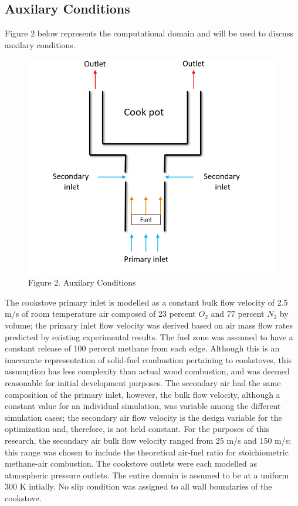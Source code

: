 \documentclass[3p,times,twocolumn]{elsarticle}
\begin{document}
\subsection{Auxilary Conditions}
Figure 2 below represents the computational domain and will be used to discuss auxilary conditions.

\begin{figure}{\linewidth}
	\includegraphics[width=\linewidth]{auxconditions}
	\centering
	\caption{Figure 2. Auxilary Conditions}
\end{figure}

The cookstove primary inlet is modelled as a constant bulk flow velocity of 2.5 m/s of room temperature air composed of 23 percent $O_{2}$ and 77 percent $N_{2}$ by volume; the primary inlet flow velocity was derived based on air mass flow rates predicted by existing experimental results. The fuel zone was assumed to have a constant release of 100 percent methane from each edge. Although this is an inaccurate representation of solid-fuel combustion pertaining to cookstoves, this assumption has less complexity than actual wood combustion, and was deemed reasonable for initial development purposes. The secondary air had the same composition of the primary inlet, however, the bulk flow velocity, although a constant value for an individual simulation, was variable among the different simulation cases; the secondary air flow velocity is the design variable for the optimization and, therefore, is not held constant. For the purposes of this research, the secondary air bulk flow velocity ranged from 25 m/s and 150 m/s; this range was chosen to include the theoretical air-fuel ratio for stoichiometric methane-air combustion. The cookstove outlets were each modelled as atmospheric pressure outlets. The entire domain is assumed to be at a uniform 300 K intially. No slip condition was assigned to all wall boundaries of the cookstove. 
\end{document}
